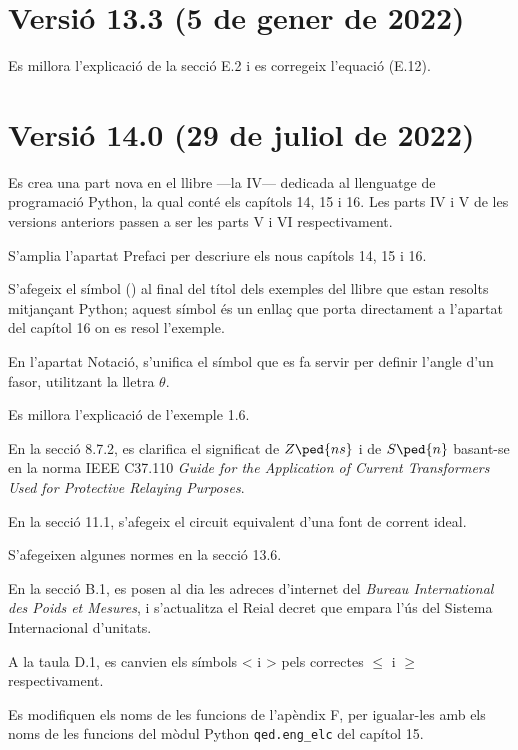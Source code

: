 \section*{Versió 13.3 (5 de gener de 2022)}

Es millora l'explicació de la secció E.2 i es corregeix l'equació (E.12).


\section*{Versió 14.0 (29 de juliol de 2022)}

Es crea una part nova en el llibre ---la IV--- dedicada al llenguatge de programació Python, la qual conté els capítols 14, 15 i 16. Les parts IV i V de les versions anteriors passen a ser les parts V  i VI  respectivament. 

S'amplia l'apartat Prefaci per descriure els nous capítols 14, 15 i 16.

S'afegeix el símbol (\faPython) al final del títol dels  exemples del llibre que estan resolts mitjançant Python; aquest símbol és un enllaç que porta directament a l'apartat del capítol 16 on es resol l'exemple.

En l'apartat Notació, s'unifica el símbol que es fa servir per definir l'angle d'un fasor, utilitzant la lletra $\theta$.

Es millora l'explicació de l'exemple 1.6.

En la secció 8.7.2, es clarifica el significat de $Z\ped{ns}$ i de $S\ped{n}$ basant-se en la norma IEEE C37.110 \textit{ Guide for the Application of Current Transformers Used for Protective Relaying Purposes}.

En la secció 11.1, s'afegeix el circuit equivalent d'una font de corrent ideal.

S'afegeixen algunes normes en la secció 13.6.

En la secció B.1, es posen al dia les adreces d'internet  del \textit{Bureau International des Poids et Mesures}, i s'actualitza el Reial decret que empara l'ús del Sistema Internacional d'unitats.

A la taula D.1, es canvien els símbols < i > pels correctes $\leq$ i $\geq$ respectivament.

Es modifiquen els noms de les funcions de l'apèndix F, per igualar-les amb els noms de les funcions del mòdul Python \texttt{qed.eng\_elc} del capítol 15.

